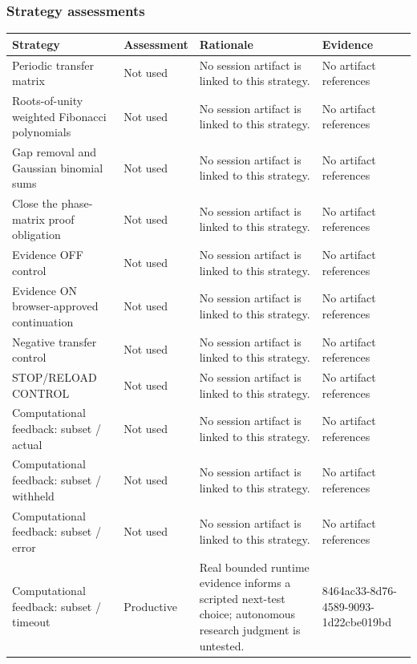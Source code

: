 \documentclass[11pt]{article}
\begin{document}
\subsubsection*{Strategy assessments}
\begin{longtable}{>{\raggedright\arraybackslash}p{.16\linewidth}>{\raggedright\arraybackslash}p{.15\linewidth}>{\raggedright\arraybackslash}p{.40\linewidth}>{\raggedright\arraybackslash}p{.17\linewidth}}
\toprule Strategy & Assessment & Rationale & Evidence \\
\midrule\endhead
Periodic transfer matrix & Not used & No session artifact is linked to this strategy. & No artifact references \\
Roots-of-unity weighted Fibonacci polynomials & Not used & No session artifact is linked to this strategy. & No artifact references \\
Gap removal and Gaussian binomial sums & Not used & No session artifact is linked to this strategy. & No artifact references \\
Close the phase-matrix proof obligation & Not used & No session artifact is linked to this strategy. & No artifact references \\
Evidence OFF control & Not used & No session artifact is linked to this strategy. & No artifact references \\
Evidence ON browser-approved continuation & Not used & No session artifact is linked to this strategy. & No artifact references \\
Negative transfer control & Not used & No session artifact is linked to this strategy. & No artifact references \\
STOP/RELOAD CONTROL & Not used & No session artifact is linked to this strategy. & No artifact references \\
Computational feedback: subset / actual & Not used & No session artifact is linked to this strategy. & No artifact references \\
Computational feedback: subset / withheld & Not used & No session artifact is linked to this strategy. & No artifact references \\
Computational feedback: subset / error & Not used & No session artifact is linked to this strategy. & No artifact references \\
Computational feedback: subset / timeout & Productive & Real bounded runtime evidence informs a scripted next-test choice; autonomous research judgment is untested. & 8464ac33-8d76-4589-9093-1d22cbe019bd \\
\bottomrule
\end{longtable}
\end{document}
